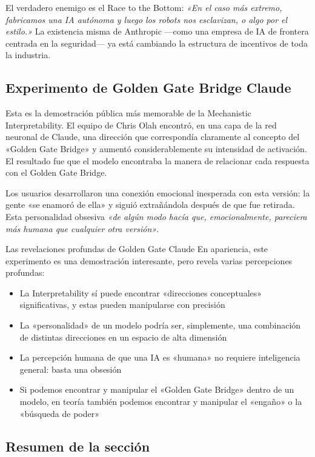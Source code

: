 \documentclass[a4paper]{article}
\begin{document}
El verdadero enemigo es el Race to the Bottom: \textit{«En el caso más extremo, fabricamos una IA autónoma y luego los robots nos esclavizan, o algo por el estilo.»} La existencia misma de Anthropic —como una empresa de IA de frontera centrada en la seguridad— ya está cambiando la estructura de incentivos de toda la industria.

\subsection{Experimento de Golden Gate Bridge Claude}

Esta es la demostración pública más memorable de la Mechanistic Interpretability. El equipo de Chris Olah encontró, en una capa de la red neuronal de Claude, una dirección que correspondía claramente al concepto del «Golden Gate Bridge» y aumentó considerablemente su intensidad de activación. El resultado fue que el modelo encontraba la manera de relacionar cada respuesta con el Golden Gate Bridge.

Los usuarios desarrollaron una conexión emocional inesperada con esta versión: la gente «se enamoró de ella» y siguió extrañándola después de que fue retirada. Esta personalidad obsesiva \textit{«de algún modo hacía que, emocionalmente, pareciera más humana que cualquier otra versión»}.

\begin{knowledgebox}{Las revelaciones profundas de Golden Gate Claude}
En apariencia, este experimento es una demostración interesante, pero revela varias percepciones profundas:
\begin{itemize}
    \item La Interpretability sí puede encontrar «direcciones conceptuales» significativas, y estas pueden manipularse con precisión
    \item La «personalidad» de un modelo podría ser, simplemente, una combinación de distintas direcciones en un espacio de alta dimensión
    \item La percepción humana de que una IA es «humana» no requiere inteligencia general: basta una obsesión
    \item Si podemos encontrar y manipular el «Golden Gate Bridge» dentro de un modelo, en teoría también podemos encontrar y manipular el «engaño» o la «búsqueda de poder»
\end{itemize}
\end{knowledgebox}

\subsection{Resumen de la sección}
\end{document}
